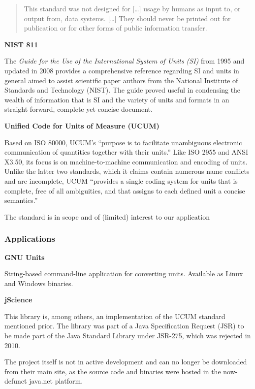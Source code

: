 \begin{quote}
This standard was not designed for {[}\ldots{}{]} usage by humans as
input to, or output from, data systems. {[}\ldots{}{]} They should never
be printed out for publication or for other forms of public information
transfer.
\end{quote}

\textbf{NIST 811}

The \emph{Guide for the Use of the International System of Units (SI)}
from 1995 and updated in 2008 provides a comprehensive reference
regarding SI and units in general aimed to assist scientific paper
authors from the National Institute of Standards and Technology (NIST).
The guide proved useful in condensing the wealth of information that is
SI and the variety of units and formats in an straight forward, complete
yet concise document.

\textbf{Unified Code for Units of Measure (UCUM)}

Based on ISO 80000, UCUM's ``purpose is to facilitate unambiguous
electronic communication of quantities together with their units.'' Like
ISO 2955 and ANSI X3.50, its focus is on machine-to-machine
communication and encoding of units. Unlike the latter two standards,
which it claims contain numerous name conflicts and are incomplete, UCUM
``provides a single coding system for units that is complete, free of
all ambiguities, and that assigns to each defined unit a concise
semantics.''

The standard is in scope and of (limited) interest to our application

\subsubsection{Applications}\label{applications}

\textbf{GNU Units}

String-based command-line application for converting units. Available as
Linux and Windows binaries.

\textbf{jScience}

This library is, among others, an implementation of the UCUM standard
mentioned prior. The library was part of a Java Specification Request
(JSR) to be made part of the Java Standard Library under JSR-275, which
was rejected in 2010.

The project itself is not in active development and can no longer be
downloaded from their main site, as the source code and binaries were
hosted in the now-defunct java.net platform.

